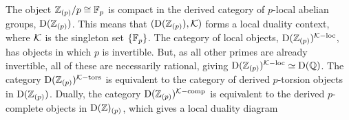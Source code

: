 \begin{example}
    The object $\mathbb{Z}_{(p)}/p \cong \mathbb{F}_p$ is compact in the derived category of $p$-local abelian groups, $\mathrm{D}(\mathbb{Z}_{(p)})$. This means that $(\mathrm{D}(\mathbb{Z}_{(p)}), \mathcal{K})$ forms a local duality context, where $\mathcal{K}$ is the singleton set $\{\mathbb{F}_p\}$. The category of local objects, $\mathrm{D}(\mathbb{Z}_{(p)})^{\mathcal{K}-\mathrm{loc}}$, has objects in which $p$ is invertible. But, as all other primes are already invertible, all of these are necessarily rational, giving $\mathrm{D}(\mathbb{Z}_{(p)})^{\mathcal{K}-\mathrm{loc}} \simeq \mathrm{D}(\mathbb{Q})$. The category $\mathrm{D}(\mathbb{Z}_{(p)})^{\mathcal{K}-\mathrm{tors}}$ is equivalent to the category of derived $p$-torsion objects in $\mathrm{D}(\mathbb{Z}_{(p)})$. Dually, the category $\mathrm{D}(\mathbb{Z}_{(p)})^{\mathcal{K}-\mathrm{comp}}$ is equivalent to the derived $p$-complete objects in $\mathrm{D}(\mathbb{Z})_{(p)}$, which gives a local duality diagram 
    \begin{center}
    \end{center}
\end{example}







































































